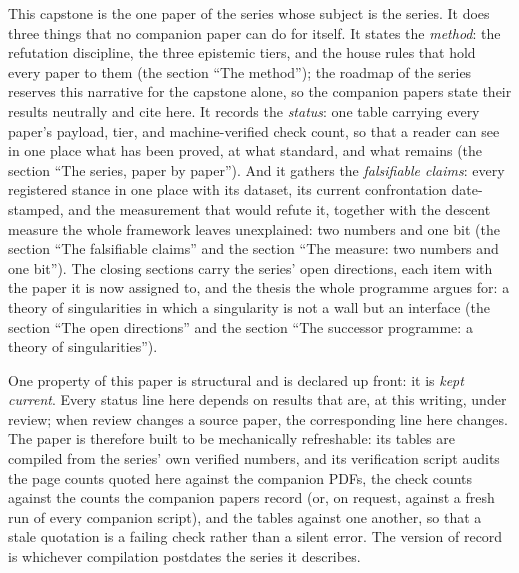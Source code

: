 \documentclass[11pt]{article}
\theoremstyle{definition}
\theoremstyle{plain}
\begin{document}
This capstone is the one paper of the series whose subject is the series. It does three things that no companion paper can do for itself. It states the \emph{method}: the refutation discipline, the three epistemic tiers, and the house rules that hold every paper to them (the section ``The method''); the roadmap of the series reserves this narrative for the capstone alone, so the companion papers state their results neutrally and cite here. It records the \emph{status}: one table carrying every paper's payload, tier, and machine-verified check count, so that a reader can see in one place what has been proved, at what standard, and what remains (the section ``The series, paper by paper''). And it gathers the \emph{falsifiable claims}: every registered stance in one place with its dataset, its current confrontation date-stamped, and the measurement that would refute it, together with the descent measure the whole framework leaves unexplained: two numbers and one bit (the section ``The falsifiable claims'' and the section ``The measure: two numbers and one bit''). The closing sections carry the series' open directions, each item with the paper it is now assigned to, and the thesis the whole programme argues for: a theory of singularities in which a singularity is not a wall but an interface (the section ``The open directions'' and the section ``The successor programme: a theory of singularities'').

One property of this paper is structural and is declared up front: it is \emph{kept current}. Every status line here depends on results that are, at this writing, under review; when review changes a source paper, the corresponding line here changes. The paper is therefore built to be mechanically refreshable: its tables are compiled from the series' own verified numbers, and its verification script audits the page counts quoted here against the companion PDFs, the check counts against the counts the companion papers record (or, on request, against a fresh run of every companion script), and the tables against one another, so that a stale quotation is a failing check rather than a silent error. The version of record is whichever compilation postdates the series it describes.
\end{document}
